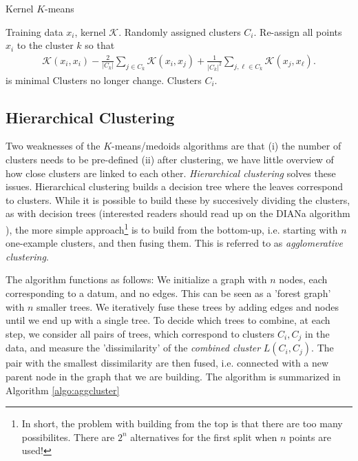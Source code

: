 \documentclass{article}
\newcommand{\abs}[1]{\vert #1 \vert}
\begin{document}
    \begin{algorithm}[tb]      
	\caption{Kernel $K$-means} 
	\label{alg:kernelkmeans}
	\begin{algorithmic} [1]
 		\REQUIRE Training data $x_i$, kernel $\mathcal{K}$.
 		\STATE Randomly assigned clusters $C_i$.
 		\REPEAT
 			\STATE  Re-assign all points $x_i$ to the cluster $k$ so that 
    \begin{align*}
        \mathcal{K}(x_i,x_i)  - \frac{2}{\abs{C_k}}\sum_{j \in C_k} \mathcal{K}(x_i,x_j) + \frac{1}{\abs{C_k}^2} \sum_{j,\ell\in C_k} \mathcal{K}(x_j,x_\ell).
    \end{align*}
    is minimal
 		\UNTIL Clusters no longer change.
 		\RETURN Clusters $C_i$.
	\end{algorithmic}
\end{algorithm}

\subsection{Hierarchical Clustering}
Two weaknesses of the $K$-means/medoids algorithms are that (i) the number of clusters needs to be pre-defined (ii) after clustering, we have little overview of how close clusters are linked to each other. \emph{Hierarchical clustering} solves these issues. Hierarchical clustering builds a decision tree where the leaves correspond to clusters. While it is possible to build these by succesively dividing the clusters, as with decision trees (interested readers should read up on the DIANa algorithm \cite{patnaik2016divisive}), the more simple approach\footnote{In short, the problem with building from the top is that there are too many possibilites. There are $2^n$ alternatives for the first split when $n$ points are used!} is to build from the bottom-up, i.e. starting with $n$ one-example clusters, and then fusing them. This is referred to as \emph{agglomerative clustering}.

The algorithm functions as follows: We initialize a graph with $n$ nodes, each corresponding to a datum, and no edges. This can be seen as a 'forest graph' with $n$ smaller trees. We iteratively fuse these trees by adding edges and nodes until we end up with a  single tree.  To decide which trees to combine, at each step, we consider all pairs of trees, which correspond to clusters $C_i, C_j$ in the data, and measure the 'dissimilarity' of the \emph{combined cluster} $L(C_i,C_j)$. The pair with the smallest dissimilarity are then fused, i.e. connected with a new parent node in the graph that we are building. The algorithm is summarized in Algorithm \eqref{algo:aggcluster}
\end{document}
